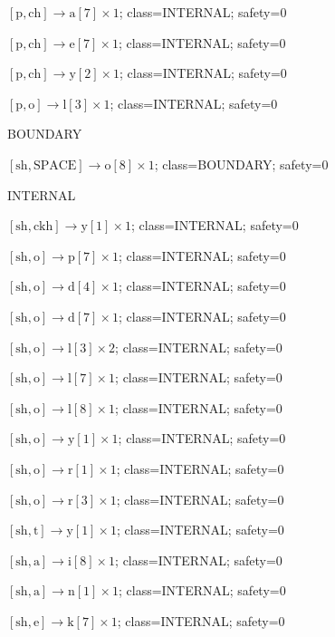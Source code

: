 \(\left[\mathrm{p}, \mathrm{ch}\right] \to \mathrm{a}[7] \times 1\); class=INTERNAL; safety=0\par
\(\left[\mathrm{p}, \mathrm{ch}\right] \to \mathrm{e}[7] \times 1\); class=INTERNAL; safety=0\par
\(\left[\mathrm{p}, \mathrm{ch}\right] \to \mathrm{y}[2] \times 1\); class=INTERNAL; safety=0\par
\(\left[\mathrm{p}, \mathrm{o}\right] \to \mathrm{l}[3] \times 1\); class=INTERNAL; safety=0\par
BOUNDARY\par
\(\left[\mathrm{sh}, \mathrm{SPACE}\right] \to \mathrm{o}[8] \times 1\); class=BOUNDARY; safety=0\par
INTERNAL\par
\(\left[\mathrm{sh}, \mathrm{ckh}\right] \to \mathrm{y}[1] \times 1\); class=INTERNAL; safety=0\par
\(\left[\mathrm{sh}, \mathrm{o}\right] \to \mathrm{p}[7] \times 1\); class=INTERNAL; safety=0\par
\(\left[\mathrm{sh}, \mathrm{o}\right] \to \mathrm{d}[4] \times 1\); class=INTERNAL; safety=0\par
\(\left[\mathrm{sh}, \mathrm{o}\right] \to \mathrm{d}[7] \times 1\); class=INTERNAL; safety=0\par
\(\left[\mathrm{sh}, \mathrm{o}\right] \to \mathrm{l}[3] \times 2\); class=INTERNAL; safety=0\par
\(\left[\mathrm{sh}, \mathrm{o}\right] \to \mathrm{l}[7] \times 1\); class=INTERNAL; safety=0\par
\(\left[\mathrm{sh}, \mathrm{o}\right] \to \mathrm{l}[8] \times 1\); class=INTERNAL; safety=0\par
\(\left[\mathrm{sh}, \mathrm{o}\right] \to \mathrm{y}[1] \times 1\); class=INTERNAL; safety=0\par
\(\left[\mathrm{sh}, \mathrm{o}\right] \to \mathrm{r}[1] \times 1\); class=INTERNAL; safety=0\par
\(\left[\mathrm{sh}, \mathrm{o}\right] \to \mathrm{r}[3] \times 1\); class=INTERNAL; safety=0\par
\(\left[\mathrm{sh}, \mathrm{t}\right] \to \mathrm{y}[1] \times 1\); class=INTERNAL; safety=0\par
\(\left[\mathrm{sh}, \mathrm{a}\right] \to \mathrm{i}[8] \times 1\); class=INTERNAL; safety=0\par
\(\left[\mathrm{sh}, \mathrm{a}\right] \to \mathrm{n}[1] \times 1\); class=INTERNAL; safety=0\par
\(\left[\mathrm{sh}, \mathrm{e}\right] \to \mathrm{k}[7] \times 1\); class=INTERNAL; safety=0\par
